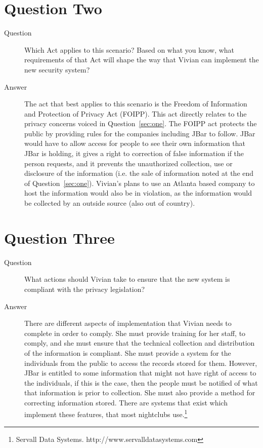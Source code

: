 \documentclass{article}
\numberwithin{equation}{section} %
\numberwithin{figure}{section} %
\numberwithin{table}{section} %
\begin{document}
\section {Question Two}
\begin{description}
	\item[Question] Which Act applies to this scenario? Based on what you know, what requirements of that 
Act will shape the way that Vivian can implement the new security system? 
	\item [Answer] The act that best applies to this scenario is the Freedom of Information and Protection of Privacy Act (FOIPP).  This act directly relates to the privacy concerns voiced in Question~\ref{sec:one}.  The FOIPP act protects the public by providing rules for the companies including JBar to follow.  JBar would have to allow access for people to see their own information that JBar is holding, it gives a right to correction of false information if the person requests, and it prevents the unauthorized collection, use or disclosure of the information (i.e. 	the sale of information noted at the end of Question~\ref{sec:one}).  Vivian's plans to use an Atlanta based company to host the information would also be in violation, as the information would be collected by an outside source (also out of country).
\end{description}

\section {Question Three}
\begin{description}
	\item[Question] What actions should Vivian take to ensure that the new system is compliant with the 
privacy legislation? 
	\item [Answer] There are different aspects of implementation that Vivian needs to complete in order to comply.  She must provide training for her staff, to comply, and she must ensure that the technical collection and distribution of the information is compliant.  She must provide a system for the individuals from the public to access the records stored for them.  However, JBar is entitled to some information that might not have right of access to the individuals, if this is the case, then the people must be notified of what that information is prior to collection.  She must also provide a method for correcting information stored.  There are systems that exist which implement these features, that most nightclubs use.\footnote{Servall Data Systems.  http://www.servalldatasystems.com}
\end{description}
\end{document}
